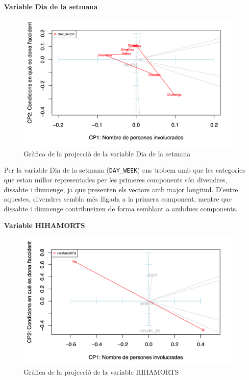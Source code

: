 \documentclass[12pt,longbibliography]{article}
\theoremstyle{definition}
\theoremstyle{remark}
\begin{document}
\textbf{Variable Dia de la setmana}

\begin{figure}[H]
\begin{center}
\includegraphics[width=12cm]{acp9}
\end{center}
\caption{Gràfica de la projecció de la variable Dia de la setmana}
\label{fig:ACP9}
\end{figure}

Per la variable Dia de la setmana (\texttt{DAY\_WEEK}) ens trobem amb que les categories que estan millor representades per les primeres components són divendres, dissabte i diumenge, ja que presenten els vectors amb major longitud. D'entre aquestes, divendres sembla més lligada a la primera component, mentre que dissabte i diumenge contribueixen de forma semblant a ambdues components.

\textbf{Variable HIHAMORTS}

\vspace{2mm}
\begin{figure}[H]
\begin{center}
\includegraphics[width=12cm]{acp10}
\end{center}
\caption{Gràfica de la projecció de la variable HIHAMORTS}
\label{fig:ACP10}
\end{figure}
\end{document}
